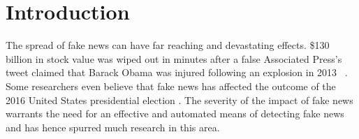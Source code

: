 \documentclass[letterpaper]{article} %
\begin{document}
\newcommand{\unverified}{{\it unverified}}
\newcommand{\nonrumor}{{\it non-rumor}}
\newcommand{\falserumor}{{\it false-rumor}}
\newcommand{\truerumor}{{\it true-rumor}}

\newcommand{\citet}[1]{\citeauthor{#1}~\shortcite{#1}}
\newcommand{\citep}{\cite}
\newcommand{\citealp}[1]{\citeauthor{#1}~\citeyear{#1}}

\maketitle

\section{Introduction}

The spread of fake news can have far reaching and devastating effects. \$130 billion in stock value was wiped out in minutes after a false Associated Press's tweet claimed that Barack Obama was injured following an explosion in 2013 ~\citep{rapoza_2017}. Some researchers even believe that fake news has affected the outcome of the 2016 United States presidential election \cite{gunther2018fake}. The severity of the impact of fake news warrants the need for an effective and automated means of detecting fake news and has hence spurred much research in this area.
\end{document}
